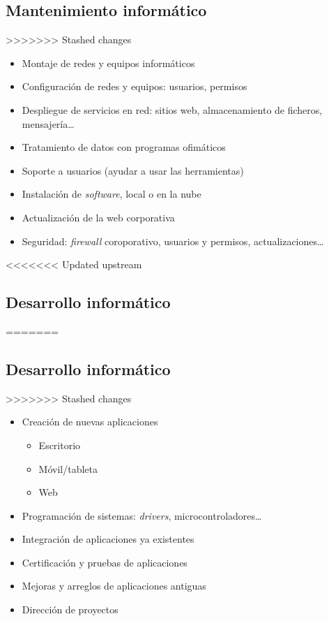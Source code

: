 \documentclass{article}
\begin{document}
\subsection*{Mantenimiento informático}
\label{sec:org000001b}
>>>>>>> Stashed changes
\begin{itemize}
\item Montaje de redes y equipos informáticos
\item Configuración de redes y equipos: usuarios, permisos
\item Despliegue de servicios en red: sitios web, almacenamiento de ficheros, mensajería\ldots{}
\item Tratamiento de datos con programas ofimáticos
\item Soporte a usuarios (ayudar a usar las herramientas)
\item Instalación de \emph{software}, local o en la nube
\item Actualización de la web corporativa
\item Seguridad: \emph{firewall} coroporativo, usuarios y permisos, actualizaciones\ldots{}
\end{itemize}

<<<<<<< Updated upstream
\subsection{Desarrollo informático}
\label{sec:org0000009}
=======
\subsection*{Desarrollo informático}
\label{sec:org000001e}
>>>>>>> Stashed changes
\begin{itemize}
\item Creación de nuevas aplicaciones
\begin{itemize}
\item Escritorio
\item Móvil/tableta
\item Web
\end{itemize}
\item Programación de sistemas: \emph{drivers}, microcontroladores\ldots{}
\item Integración de aplicaciones ya existentes
\item Certificación y pruebas de aplicaciones
\item Mejoras y arreglos de aplicaciones antiguas
\item Dirección de proyectos
\end{itemize}
\end{document}
